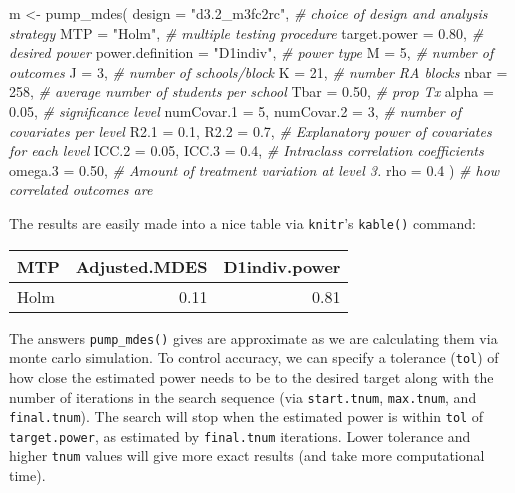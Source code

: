 \documentclass[
]{article}
\newenvironment{Shaded}{\begin{snugshade}}{\end{snugshade}}
\newcommand{\AttributeTok}[1]{\textcolor[rgb]{0.77,0.63,0.00}{#1}}
\newcommand{\CommentTok}[1]{\textcolor[rgb]{0.56,0.35,0.01}{\textit{#1}}}
\newcommand{\DecValTok}[1]{\textcolor[rgb]{0.00,0.00,0.81}{#1}}
\newcommand{\FloatTok}[1]{\textcolor[rgb]{0.00,0.00,0.81}{#1}}
\newcommand{\FunctionTok}[1]{\textcolor[rgb]{0.00,0.00,0.00}{#1}}
\newcommand{\NormalTok}[1]{#1}
\newcommand{\OtherTok}[1]{\textcolor[rgb]{0.56,0.35,0.01}{#1}}
\newcommand{\StringTok}[1]{\textcolor[rgb]{0.31,0.60,0.02}{#1}}
\begin{document}
\begin{Shaded}
\begin{Highlighting}[]
\NormalTok{m }\OtherTok{\textless{}{-}} \FunctionTok{pump\_mdes}\NormalTok{(}
            \AttributeTok{design =} \StringTok{"d3.2\_m3fc2rc"}\NormalTok{, }\CommentTok{\# choice of design and analysis strategy}
            \AttributeTok{MTP =} \StringTok{"Holm"}\NormalTok{, }\CommentTok{\# multiple testing procedure}
            \AttributeTok{target.power =} \FloatTok{0.80}\NormalTok{, }\CommentTok{\# desired power}
            \AttributeTok{power.definition =} \StringTok{"D1indiv"}\NormalTok{, }\CommentTok{\# power type}
            \AttributeTok{M =} \DecValTok{5}\NormalTok{, }\CommentTok{\# number of outcomes}
            \AttributeTok{J =} \DecValTok{3}\NormalTok{, }\CommentTok{\# number of schools/block}
            \AttributeTok{K =} \DecValTok{21}\NormalTok{, }\CommentTok{\# number RA blocks}
            \AttributeTok{nbar =} \DecValTok{258}\NormalTok{, }\CommentTok{\# average number of students per school}
            \AttributeTok{Tbar =} \FloatTok{0.50}\NormalTok{, }\CommentTok{\# prop Tx}
            \AttributeTok{alpha =} \FloatTok{0.05}\NormalTok{, }\CommentTok{\# significance level}
            \AttributeTok{numCovar.1 =} \DecValTok{5}\NormalTok{, }\AttributeTok{numCovar.2 =} \DecValTok{3}\NormalTok{, }\CommentTok{\# number of covariates per level}
            \AttributeTok{R2.1 =} \FloatTok{0.1}\NormalTok{, }\AttributeTok{R2.2 =} \FloatTok{0.7}\NormalTok{, }\CommentTok{\# Explanatory power of covariates for each level}
            \AttributeTok{ICC.2 =} \FloatTok{0.05}\NormalTok{, }\AttributeTok{ICC.3 =} \FloatTok{0.4}\NormalTok{, }\CommentTok{\# Intraclass correlation coefficients}
            \AttributeTok{omega.3 =} \FloatTok{0.50}\NormalTok{, }\CommentTok{\# Amount of treatment variation at level 3.}
            \AttributeTok{rho =} \FloatTok{0.4}\NormalTok{ ) }\CommentTok{\# how correlated outcomes are}
\end{Highlighting}
\end{Shaded}

The results are easily made into a nice table via \texttt{knitr}'s
\texttt{kable()} command:

\begin{tabular}{l|r|r}
\hline
MTP & Adjusted.MDES & D1indiv.power\\
\hline
Holm & 0.11 & 0.81\\
\hline
\end{tabular}

The answers \texttt{pump\_mdes()} gives are approximate as we are
calculating them via monte carlo simulation. To control accuracy, we can
specify a tolerance (\texttt{tol}) of how close the estimated power
needs to be to the desired target along with the number of iterations in
the search sequence (via \texttt{start.tnum}, \texttt{max.tnum}, and
\texttt{final.tnum}). The search will stop when the estimated power is
within \texttt{tol} of \texttt{target.power}, as estimated by
\texttt{final.tnum} iterations. Lower tolerance and higher \texttt{tnum}
values will give more exact results (and take more computational time).
\end{document}
